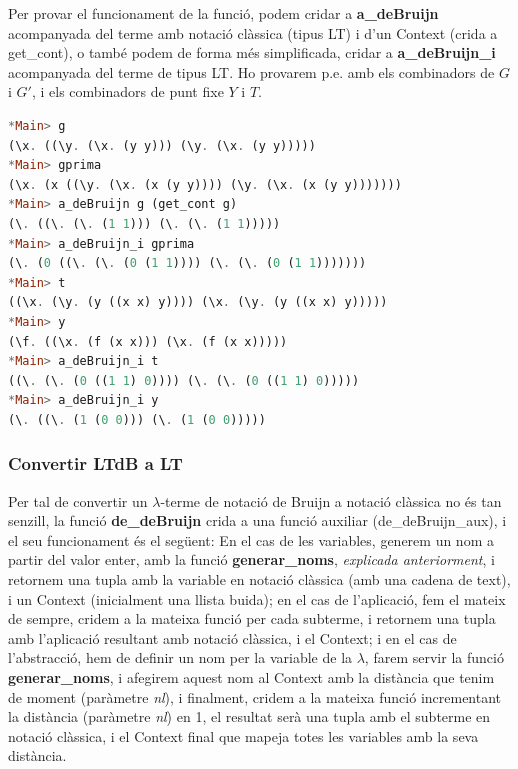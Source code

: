\documentclass[10pt,a4paper]{article}
\begin{document}
Per provar el funcionament de la funció, podem cridar a \textbf{a\_deBruijn} acompanyada del terme amb notació clàssica (tipus LT) i d'un Context (crida a get\_cont), o també podem de forma més simplificada, cridar a \textbf{a\_deBruijn\_i} acompanyada del terme de tipus LT. Ho provarem p.e. amb els combinadors de $G$ i $G'$, i els combinadors de punt fixe $Y$ i $T$. 

\begin{lstlisting}[language=Haskell]
*Main> g
(\x. ((\y. (\x. (y y))) (\y. (\x. (y y)))))
*Main> gprima
(\x. (x ((\y. (\x. (x (y y)))) (\y. (\x. (x (y y)))))))
*Main> a_deBruijn g (get_cont g)
(\. ((\. (\. (1 1))) (\. (\. (1 1)))))
*Main> a_deBruijn_i gprima
(\. (0 ((\. (\. (0 (1 1)))) (\. (\. (0 (1 1)))))))
*Main> t
((\x. (\y. (y ((x x) y)))) (\x. (\y. (y ((x x) y)))))
*Main> y
(\f. ((\x. (f (x x))) (\x. (f (x x)))))
*Main> a_deBruijn_i t
((\. (\. (0 ((1 1) 0)))) (\. (\. (0 ((1 1) 0)))))
*Main> a_deBruijn_i y
(\. ((\. (1 (0 0))) (\. (1 (0 0)))))
\end{lstlisting}

\clearpage

\subsubsection*{Convertir LTdB a LT}

Per tal de convertir un $\lambda$-terme de notació de Bruijn a notació clàssica no és tan senzill, la funció \textbf{de\_deBruijn} crida a una funció auxiliar (de\_deBruijn\_aux), i el seu funcionament és el següent: En el cas de les variables, generem un nom a partir del valor enter, amb la funció \textbf{generar\_noms}, \textit{explicada anteriorment}, i retornem una tupla amb la variable en notació clàssica (amb una cadena de text), i un Context (inicialment una llista buida); en el cas de l'aplicació, fem el mateix de sempre, cridem a la mateixa funció per cada subterme, i retornem una tupla amb l'aplicació resultant amb notació clàssica, i el Context; i en el cas de l'abstracció, hem de definir un nom per la variable de la $\lambda$, farem servir la funció \textbf{generar\_noms}, i afegirem aquest nom al Context amb la distància que tenim de moment (paràmetre \textit{nl}), i finalment, cridem a la mateixa funció incrementant la distància (paràmetre \textit{nl}) en 1, el resultat serà una tupla amb el subterme en notació clàssica, i el Context final que mapeja totes les variables amb la seva distància.
\end{document}

